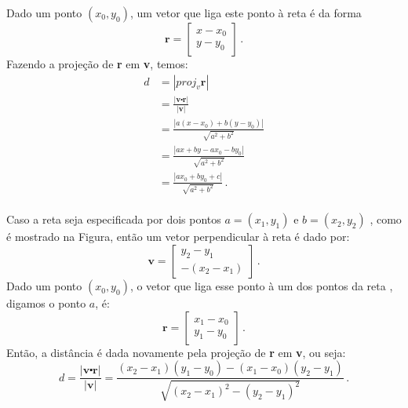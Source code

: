 Dado um ponto $(x_0, y_0)$, um vetor que liga este ponto à reta é da forma
\begin{equation*}
\textbf{r}=\left[ \begin{array}{c} x-x_0\\ y-y_0 \end{array} \right]\,.
\end{equation*}
Fazendo a projeção de \textbf{r} em \textbf{v}, temos:
\begin{equation*}
\begin{aligned}
d&=|proj_v\textbf{r}| \\
&=\frac{|\textbf{v}\centerdot \textbf{r}|}{|\textbf{v}|} \\
&=\frac{|a(x-x_0)+b(y-y_0)|}{\sqrt{a^2+b^2}} \\
&=\frac{|ax+by-ax_0-by_0|}{\sqrt{a^2+b^2}} \\
&=\frac{|ax_0+by_0+c|}{\sqrt{a^2+b^2}}\,. \\
\end{aligned}
\end{equation*}

Caso a reta seja especificada por dois pontos $a=(x_1, y_1)$ e
$b=(x_2, y_2)$ , como é mostrado na Figura, então um vetor
perpendicular à reta é dado por:
\begin{equation*}
\textbf{v}=\left[ \begin{array}{c} y_2-y_1 \\ -(x_2-x_1) \end{array}\right] \,.
\end{equation*}
Dado um ponto $(x_0, y_0)$, o vetor que liga esse ponto à um dos pontos da reta
, digamos o ponto $a$, é:
\begin{equation*}
\textbf{r}=\left[ \begin{array}{c} x_1-x_0 \\ y_1-y_0\end{array}\right] \,.
\end{equation*}
Então, a distância é dada novamente pela projeção de \textbf{r} em \textbf{v},
ou seja:
\begin{equation*}
d =\frac{|\textbf{v}\centerdot \textbf{r}|}{|\textbf{v}|} =
\frac{(x_2-x_1)(y_1-y_0)-(x_1-x_0)(y_2-y_1)}{\sqrt{(x_2-x_1)^2-(y_2-y_1)^2}}\,.
\end{equation*}
